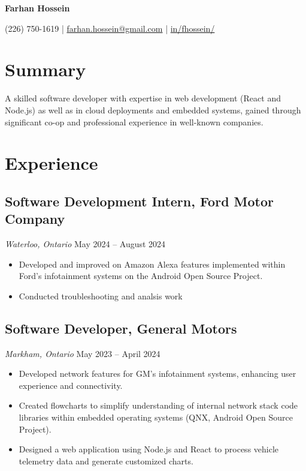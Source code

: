 \documentclass[a4paper,11pt]{article}  %
\begin{document}
\begin{center}
    {\Huge\textbf{Farhan Hossein}}
\end{center}
\vspace{-4mm}

\begin{center}
    \small{
    (226) 750-1619 | \href{mailto:farhan.hossein@gmail.com}{farhan.hossein@gmail.com} | 
    \href{https://linkedin.com/in/fhossein}{in/fhossein/}
    }
\end{center}
\vspace{-6mm}

\section{Summary}
\noindent A skilled software developer with expertise in web development (React and Node.js) as well as in cloud deployments and embedded systems, gained through significant co-op and professional experience in well-known companies.

\section{Experience}

\subsection*{Software Development Intern, Ford Motor Company}
\textit{Waterloo, Ontario} \hfill May 2024 -- August 2024
\begin{itemize}
    \item Developed and improved on Amazon Alexa features implemented within Ford's infotainment systems on the Android Open Source Project. 
    \item Conducted troubleshooting and analsis work 
\end{itemize}

\subsection*{Software Developer, General Motors}
\textit{Markham, Ontario} \hfill May 2023 -- April 2024
\begin{itemize}
    \item Developed network features for GM’s infotainment systems, enhancing user experience and connectivity.
    \item Created flowcharts to simplify understanding of internal network stack code libraries within embedded operating systems (QNX, Android Open Source Project).
    \item Designed a web application using Node.js and React to process vehicle telemetry data and generate customized charts.
\end{itemize}
\end{document}

